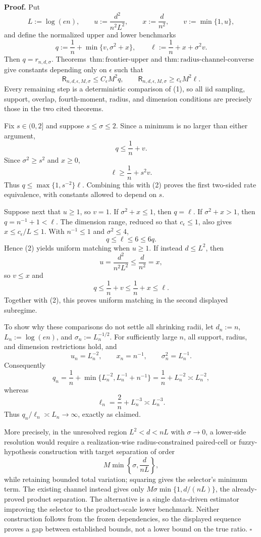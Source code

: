 \textbf{Proof.}
Put
\[
 L:=\log(en),\qquad
 u:=\frac{d^2}{n^2L^2},\qquad
 x:=\frac d{n^2},\qquad
 v:=\min\{1,u\},
\]
and define the normalized upper and lower benchmarks
\[
 q:=\frac1n+\min\{v,\sigma^2+x\},
 \qquad
 \ell:=\frac1n+x+\sigma^2v.
\tag{1}
\]
Then \(q=r_{n,d,\sigma}\).  Theorems~\(\mathrm{thm:frontier\text{-}upper}\) and \(\mathrm{thm:radius\text{-}channel\text{-}converse}\) give constants depending only on \(\epsilon\) such that
\[
 \mathsf R_{n,d,\epsilon,M,\sigma}\le C_{\epsilon}M^2q,
 \qquad
 \mathsf R_{n,d,\epsilon,M,\sigma}\ge c_{\epsilon}M^2\ell.
\tag{2}
\]
Every remaining step is a deterministic comparison of (1), so all iid sampling, support, overlap, fourth-moment, radius, and dimension conditions are precisely those in the two cited theorems.

Fix \(s\in(0,2]\) and suppose \(s\le\sigma\le2\).  Since a minimum is no larger than either argument,
\[
 q\le\frac1n+v.
\tag{3}
\]
Since \(\sigma^2\ge s^2\) and \(x\ge0\),
\[
 \ell\ge\frac1n+s^2v.
\tag{4}
\]
Thus \(q\le\max\{1,s^{-2}\}\ell\).  Combining this with (2) proves the first two-sided rate equivalence, with constants allowed to depend on \(s\).

Suppose next that \(u\ge1\), so \(v=1\).  If \(\sigma^2+x\le1\), then \(q=\ell\).  If \(\sigma^2+x>1\), then \(q=n^{-1}+1<\ell\).  The dimension range, reduced so that \(c_{\epsilon}\le1\), also gives \(x\le c_{\epsilon}/L\le1\).  With \(n^{-1}\le1\) and \(\sigma^2\le4\),
\[
 q\le\ell\le6\le6q.
\tag{5}
\]
Hence (2) yields uniform matching when \(u\ge1\).  If instead \(d\le L^2\), then
\[
 u=\frac{d^2}{n^2L^2}\le\frac d{n^2}=x,
\]
so \(v\le x\) and
\[
 q\le\frac1n+v\le\frac1n+x\le\ell.
\tag{6}
\]
Together with (2), this proves uniform matching in the second displayed subregime.

To show why these comparisons do not settle all shrinking radii, let \(d_n:=n\), \(L_n:=\log(en)\), and \(\sigma_n:=L_n^{-1/2}\).  For sufficiently large \(n\), all support, radius, and dimension restrictions hold, and
\[
 u_n=L_n^{-2},\qquad x_n=n^{-1},\qquad \sigma_n^2=L_n^{-1}.
\]
Consequently
\[
 q_n=\frac1n+\min\{L_n^{-2},L_n^{-1}+n^{-1}\}
 =\frac1n+L_n^{-2}\asymp L_n^{-2},
\tag{7}
\]
whereas
\[
 \ell_n=\frac2n+L_n^{-3}\asymp L_n^{-3}.
\tag{8}
\]
Thus \(q_n/\ell_n\asymp L_n\to\infty\), exactly as claimed.

More precisely, in the unresolved region \(L^2<d<nL\) with \(\sigma\to0\), a lower-side resolution would require a realization-wise radius-constrained paired-cell or fuzzy-hypothesis construction with target separation of order
\[
 M\min\left\{\sigma,\frac d{nL}\right\},
\]
while retaining bounded total variation; squaring gives the selector's minimum term.  The existing channel instead gives only
\(M\sigma\min\{1,d/(nL)\}\), the already-proved product separation.  The alternative is a single data-driven estimator improving the selector to the product-scale lower benchmark.  Neither construction follows from the frozen dependencies, so the displayed sequence proves a gap between established bounds, not a lower bound on the true ratio. \(\square\)